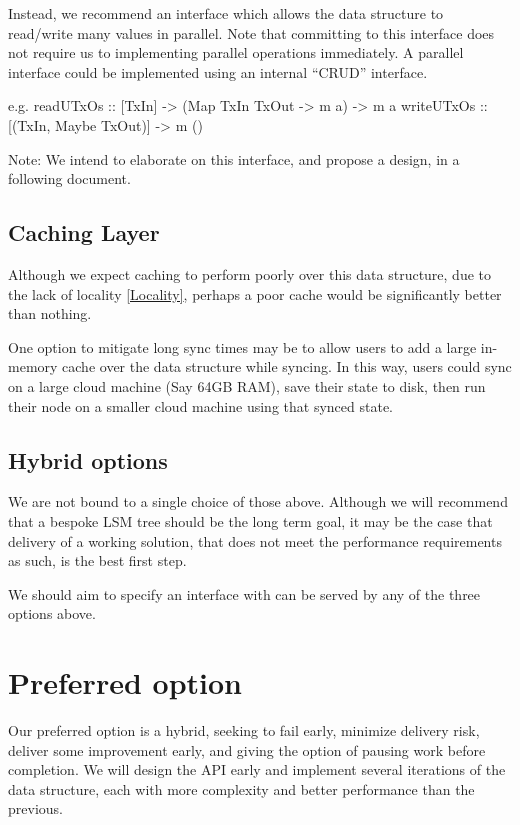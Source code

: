 \documentclass[11pt,a4paper]{article}
\begin{document}
Instead, we recommend an interface which allows the data structure to read/write
many values in parallel. Note that committing to this interface does not require
us to implementing parallel operations immediately. A parallel interface could
be implemented using an internal ``CRUD'' interface.

e.g.
readUTxOs :: [TxIn] -> (Map TxIn TxOut -> m a) -> m a
writeUTxOs :: [(TxIn, Maybe TxOut)] -> m ()


Note: We intend to elaborate on this interface, and propose a design, in a
following document.

\subsection{Caching Layer}
\label{Caching Layer}

Although we expect caching to perform poorly over this data structure, due to the
lack of locality \ref{Locality}, perhaps a poor cache would be significantly
better than nothing.

One option to mitigate long sync times may be to allow users to add a large
in-memory cache over the data structure while syncing. In this way, users could
sync on a large cloud machine (Say 64GB RAM), save their state to disk, then run
their node on a smaller cloud machine using that synced state.


\subsection{Hybrid options}

We are not bound to a single choice of those above. Although we will recommend that
a bespoke LSM tree should be the long term goal, it may be the case that delivery of a
working solution, that does not meet the performance requirements as such, is
the best first step.

We should aim to specify an interface with can be served by any of the three
options above.

\section{Preferred option}
\label{preferred}

Our preferred option is a hybrid, seeking to fail early, minimize delivery risk,
deliver some improvement early, and giving the option of pausing work before
completion. We will design the API early and implement several iterations of the
data structure, each with more complexity and better performance than the
previous.
\end{document}
